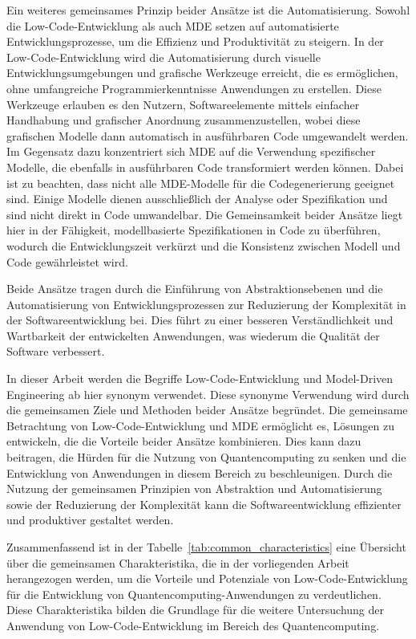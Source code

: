 Ein weiteres gemeinsames Prinzip beider Ansätze ist die Automatisierung. Sowohl die Low-Code-Entwicklung als auch  
MDE setzen auf automatisierte Entwicklungsprozesse, um die Effizienz und Produktivität zu steigern. In der Low-Code-Entwicklung 
wird die Automatisierung durch visuelle Entwicklungsumgebungen und grafische Werkzeuge erreicht, die es ermöglichen, ohne umfangreiche 
Programmierkenntnisse Anwendungen zu erstellen. Diese Werkzeuge erlauben es den Nutzern, Softwareelemente mittels einfacher Handhabung 
und grafischer Anordnung zusammenzustellen, wobei diese grafischen Modelle dann automatisch in ausführbaren Code umgewandelt werden. 
Im Gegensatz dazu konzentriert sich MDE auf die Verwendung spezifischer Modelle, die ebenfalls in ausführbaren Code transformiert werden 
können. Dabei ist zu beachten, dass nicht alle MDE-Modelle für die Codegenerierung geeignet sind. Einige Modelle dienen ausschließlich 
der Analyse oder Spezifikation und sind nicht direkt in Code umwandelbar. Die Gemeinsamkeit beider Ansätze liegt hier in der Fähigkeit, 
modellbasierte Spezifikationen in Code zu überführen, wodurch die Entwicklungszeit verkürzt und die Konsistenz zwischen Modell und 
Code gewährleistet wird.

Beide Ansätze tragen durch die Einführung von Abstraktionsebenen und die Automatisierung von Entwicklungsprozessen zur Reduzierung 
der Komplexität in der Softwareentwicklung bei. Dies führt zu einer besseren Verständlichkeit und Wartbarkeit der entwickelten 
Anwendungen, was wiederum die Qualität der Software verbessert.

In dieser Arbeit werden die Begriffe Low-Code-Entwicklung und Model-Driven Engineering ab hier synonym verwendet. Diese synonyme Verwendung 
wird durch die gemeinsamen Ziele und Methoden beider Ansätze begründet. Die gemeinsame Betrachtung von Low-Code-Entwicklung und 
MDE ermöglicht es, Lösungen zu entwickeln, die die Vorteile beider Ansätze kombinieren. Dies kann dazu beitragen, die 
Hürden für die Nutzung von Quantencomputing zu senken und die Entwicklung 
von Anwendungen in diesem Bereich zu beschleunigen. Durch die Nutzung der gemeinsamen Prinzipien von Abstraktion und Automatisierung 
sowie der Reduzierung der Komplexität kann die Softwareentwicklung effizienter und produktiver gestaltet werden.

Zusammenfassend ist in der Tabelle~\ref{tab:common_characteristics} eine Übersicht über die gemeinsamen Charakteristika, die 
in der vorliegenden Arbeit herangezogen werden, um die Vorteile und Potenziale von Low-Code-Entwicklung 
für die Entwicklung von Quantencomputing-Anwendungen zu verdeutlichen. Diese Charakteristika bilden die Grundlage für die 
weitere Untersuchung der Anwendung von Low-Code-Entwicklung im Bereich des Quantencomputing. 

